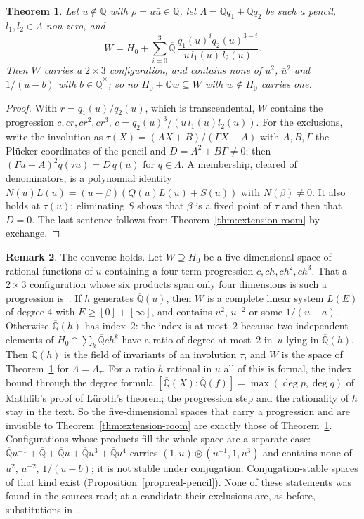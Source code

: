 \documentclass[11pt,a4paper]{article}
\theoremstyle{plain}
\newtheorem{theorem}{Theorem}[section]
\theoremstyle{definition}
\newtheorem{remark}[theorem]{Remark}
\newcommand{\Alg}{\overline{\mathbb{Q}}}
\begin{document}
\begin{theorem}\label{thm:involution}
Let $u\notin\Alg$ with $\rho=u\bar u\in\Alg$, let $\Lambda=\Alg q_{1}+\Alg q_{2}$ be such a pencil, $l_{1},l_{2}\in\Lambda$
non-zero, and
\[
  W=H_{0}+\sum_{i=0}^{3}\Alg\,\frac{q_{1}(u)^{i}q_{2}(u)^{3-i}}{u\,l_{1}(u)\,l_{2}(u)} .
\]
Then $W$ carries a $2\times3$ configuration, and contains none of $u^{2}$, $\bar u^{2}$ and $1/(u-b)$ with
$b\in\Alg^{\times}$; so no $H_{0}+\Alg w\subseteq W$ with $w\notin H_{0}$ carries one.
\end{theorem}

\begin{proof}
With $r=q_{1}(u)/q_{2}(u)$, which is transcendental, $W$ contains the progression $c,cr,cr^{2},cr^{3}$,
$c=q_{2}(u)^{3}/(u\,l_{1}(u)l_{2}(u))$. For the exclusions, write the involution as $\tau(X)=(AX+B)/(\Gamma X-A)$ with
$A,B,\Gamma$ the Plücker coordinates of the pencil and $D=A^{2}+B\Gamma\neq0$; then $(\Gamma u-A)^{2}q(\tau u)=D\,q(u)$
for $q\in\Lambda$. A membership, cleared of denominators, is a polynomial identity $N(u)L(u)=(u-\beta)(Q(u)L(u)+S(u))$
with $N(\beta)\neq0$. It also holds at $\tau(u)$; eliminating $S$ shows that $\beta$ is a fixed point of $\tau$ and
then that $D=0$. The last sentence follows from Theorem~\ref{thm:extension-room} by exchange.
\end{proof}

\begin{remark}\label{rem:involution-converse}
The converse holds. Let $W\supseteq H_{0}$ be a five-dimensional space of rational functions of
$u$ containing a four-term progression $c,ch,ch^{2},ch^{3}$. That a $2\times3$ configuration whose six products span
only four dimensions is such a progression is~\cite[Lemma~4]{bachoc-serra-zemor}. If $h$ generates $\Alg(u)$, then
$W$ is a complete linear system $L(E)$ of degree $4$ with $E\geq[0]+[\infty]$, and contains $u^{2}$, $u^{-2}$ or some
$1/(u-a)$. Otherwise $\Alg(h)$ has index~$2$: the index is at most~$2$ because two independent elements of
$H_{0}\cap\sum_{k}\Alg ch^{k}$ have a ratio of degree at most~$2$ in~$u$ lying in $\Alg(h)$. Then $\Alg(h)$ is the
field of invariants of an involution $\tau$, and $W$ is the space of Theorem~\ref{thm:involution} for
$\Lambda=\Lambda_{\tau}$. For a ratio $h$ rational in $u$ all of this is formal, the index bound through the
degree formula $[\Alg(X):\Alg(f)]=\max(\deg p,\deg q)$ of Mathlib's proof of L\"uroth's theorem; the progression
step and the rationality of $h$ stay in the text. So the five-dimensional spaces that carry a progression
and are invisible to Theorem~\ref{thm:extension-room} are exactly those of Theorem~\ref{thm:involution}. Configurations
whose products fill the whole space are a separate case: $\Alg u^{-1}+\Alg+\Alg u+\Alg u^{3}+\Alg u^{4}$ carries
$(1,u)\otimes(u^{-1},1,u^{3})$ and contains none of $u^{2}$, $u^{-2}$, $1/(u-b)$; it is not stable under conjugation.
Conjugation-stable spaces of that kind exist (Proposition~\ref{prop:real-pencil}). None of these statements was
found in the sources read; at a candidate their exclusions are, as before, substitutions
in~\cite[Th\'eor\`eme~7(2)]{diaz-2007}.
\end{remark}
\end{document}
